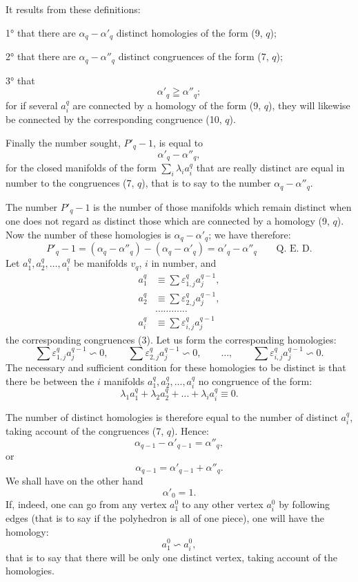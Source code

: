\documentclass{article}
\begin{document}
It results from these definitions:

1° that there are $\alpha_{q} - \alpha'_{q}$ distinct homologies of the form (9, $q$);

2° that there are $\alpha_{q} - \alpha''_{q}$ distinct congruences of the form (7, $q$);

3° that
\[ \alpha'_{q} \geqq \alpha''_{q}; \]
for if several $a^{q}_{i}$ are connected by a homology of the form (9, $q$), they will likewise be connected by the corresponding congruence (10, $q$).

Finally the number sought, $P'_{q} - 1$, is equal to
\[ \alpha'_{q} - \alpha''_{q}, \]
for the closed manifolds of the form $\displaystyle\sum_{i} \lambda_{i} a^{q}_{i}$ that are really distinct are equal in number to the congruences (7, $q$), that is to say to the number $\alpha_{q} - \alpha''_{q}$.

The number $P'_{q} - 1$ is the number of those manifolds which remain
distinct when one does not regard as distinct those which are connected by a homology (9, $q$). Now the number of these homologies is $\alpha_{q} - \alpha'_{q}$; we have therefore:
\[ P'_{q} - 1 = (\alpha_{q} - \alpha''_{q}) - (\alpha_{q} - \alpha'_{q}) = \alpha'_{q} - \alpha''_{q} \qquad \text{Q.~E.~D.} \]
Let $a^{q}_{1}, a^{q}_{2}, \ldots, a^{q}_{i}$ be manifolds $v_{q}$, $i$ in number, and
\[ \begin{aligned} a^{q}_{1} &\equiv \sum \varepsilon^{q}_{1,j} a^{q-1}_{j}, \\ a^{q}_{2} &\equiv \sum \varepsilon^{q}_{2,j} a^{q-1}_{j}, \\ &\ldots\ldots\ldots\ldots \\ a^{q}_{i} &\equiv \sum \varepsilon^{q}_{i,j} a^{q-1}_{j} \end{aligned} \]
the corresponding congruences (3). Let us form the corresponding homologies:
\[ \sum \varepsilon^{q}_{1,j} a^{q-1}_{j} \backsim 0, \qquad \sum \varepsilon^{q}_{2,j} a^{q-1}_{j} \backsim 0, \qquad \ldots, \qquad \sum \varepsilon^{q}_{i,j} a^{q-1}_{j} \backsim 0. \]
The necessary and sufficient condition for these homologies to be distinct is that there be between the $i$ manifolds $a^{q}_{1}, a^{q}_{2}, \ldots, a^{q}_{i}$ no congruence of the form:
\[ \lambda_{1} a^{q}_{1} + \lambda_{2} a^{q}_{2} + \ldots + \lambda_{i} a^{q}_{i} \equiv 0. \]

The number of distinct homologies is therefore equal to the number of distinct $a^{q}_{i}$, taking account of the congruences (7, $q$). Hence:
\[ \alpha_{q-1} - \alpha'_{q-1} = \alpha''_{q}, \]
or
\[ \alpha_{q-1} = \alpha'_{q-1} + \alpha''_{q}. \]
We shall have on the other hand
\[ \alpha'_{0} = 1. \]
If, indeed, one can go from any vertex $a^{0}_{1}$ to any other
vertex $a^{0}_{i}$ by following edges (that is to say if the polyhedron is all of one piece), one will have the homology:
\[ a^{0}_{1} \backsim a^{0}_{i}, \]
that is to say that there will be only one distinct vertex, taking account of the homologies.
\end{document}
